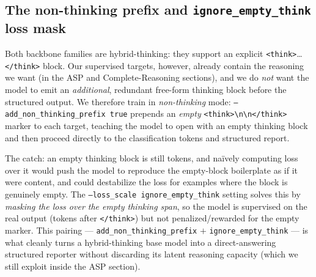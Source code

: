 \documentclass[11pt,a4paper]{article}
\begin{document}
\subsection{The non-thinking prefix and \texttt{ignore\_empty\_think} loss mask}
\label{sec:nonthinking}
Both backbone families are hybrid-thinking: they support an explicit \texttt{<think>}\dots\texttt{</think>} block. Our supervised targets, however, already contain the reasoning we want (in the ASP and Complete-Reasoning sections), and we do \emph{not} want the model to emit an \emph{additional}, redundant free-form thinking block before the structured output. We therefore train in \emph{non-thinking} mode: \texttt{--add\_non\_thinking\_prefix true} prepends an \emph{empty} \texttt{<think>\textbackslash n\textbackslash n</think>} marker to each target, teaching the model to open with an empty thinking block and then proceed directly to the classification tokens and structured report.

The catch: an empty thinking block is still tokens, and naïvely computing loss over it would push the model to reproduce the empty-block boilerplate as if it were content, and could destabilize the loss for examples where the block is genuinely empty. The \texttt{--loss\_scale ignore\_empty\_think} setting solves this by \emph{masking the loss over the empty thinking span}, so the model is supervised on the real output (tokens after \texttt{</think>}) but not penalized/rewarded for the empty marker. This pairing --- \texttt{add\_non\_thinking\_prefix} $+$ \texttt{ignore\_empty\_think} --- is what cleanly turns a hybrid-thinking base model into a direct-answering structured reporter without discarding its latent reasoning capacity (which we still exploit inside the ASP section).
\end{document}
